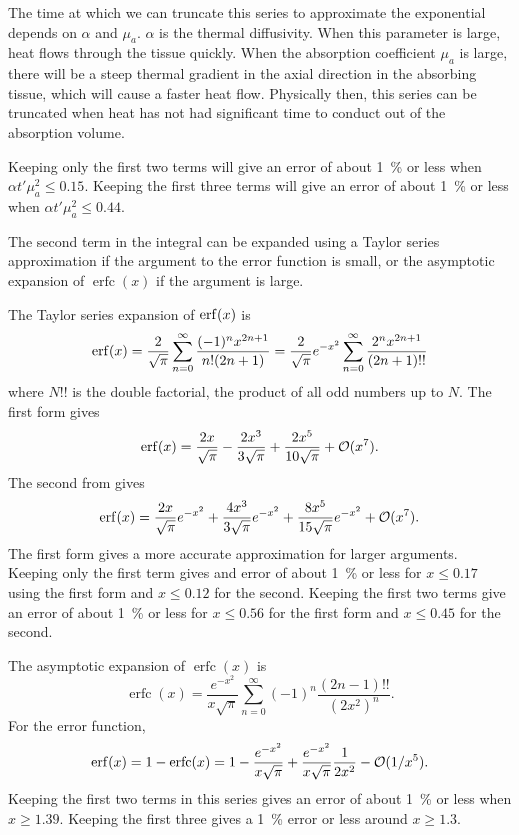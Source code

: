 \documentclass[]{article}
\DeclareMathOperator\erfc{erfc}
\begin{document}
The time at which we can truncate this series to approximate the exponential depends on $\alpha$ and $\mu_a$. $\alpha$ is the thermal diffusivity. When this parameter is large, heat
flows through the tissue quickly. When the absorption coefficient $\mu_a$ is large, there will be a steep thermal gradient in the axial direction in the absorbing tissue, which will cause
a faster heat flow. Physically then, this series can be truncated when heat has not had significant time to conduct out of the absorption volume.

Keeping only the first two terms will give an error of about \SI{1}{\percent} or less when $\alpha t' \mu_a^2 \le 0.15$. Keeping the first three terms will give an error of about \SI{1}{\percent} or less when
$\alpha t' \mu_a^2 \le 0.44$.

The second term in the integral can be expanded using a Taylor series approximation if the argument to the error function is small, or the asymptotic expansion of $\erfc(x)$ if the argument is large.

The Taylor series expansion of $\erf(x)$ is
\begin{equation}
	\erf(x) = \frac{2}{\sqrt{\pi}} \sum_{n=0}^\infty \frac{(-1)^n x^{2n+1}} { n! (2n+1)} = \frac{2}{\sqrt{\pi}} e^{-x^2} \sum_{n=0}^{\infty} \frac{2^n x^{2n+1}}{(2n+1)!!}
\end{equation}
where $N!!$ is the double factorial, the product of all odd numbers up to $N$. 
The first form gives
\begin{equation}
	\erf(x) = \frac{2x}{\sqrt{\pi}} - \frac{2x^3}{3\sqrt{\pi}}   + \frac{2x^5}{10\sqrt{\pi}}  + \mathcal{O}(x^7).
\end{equation}
The second from gives
\begin{equation}
	\erf(x) = \frac{2x}{\sqrt{\pi}} e^{-x^2} + \frac{4x^3}{3\sqrt{\pi}} e^{-x^2}  + \frac{8x^5}{15\sqrt{\pi}} e^{-x^2}+  \mathcal{O}(x^7).
\end{equation}
The first form gives a more accurate approximation for larger arguments. Keeping only the first term gives and error of about \SI{1}{\percent} or less for $x \le 0.17$ using the first form and $x \le 0.12$ for the second. Keeping the first two terms give an error of about \SI{1}{\percent} or less for $x \le 0.56$ for the first form and $x \le 0.45$ for the second.

	
The asymptotic expansion of $\erfc(x)$ is
\begin{equation}
	\erfc(x) = \frac{e^{-x^2}}{x\sqrt{\pi}} \sum_{n=0}^{\infty} (-1)^n \frac{(2n-1)!!}{(2x^2)^n}.
\end{equation}
For the error function,
\begin{equation}
	\erf(x) = 1 - \erfc(x) = 1 - \frac{e^{-x^2}}{x\sqrt{\pi}} +  \frac{e^{-x^2}}{x\sqrt{\pi}} \frac{1}{2 x^2} - \mathcal{O}( 1/x^5).
\end{equation}
Keeping the first two terms in this series gives an error of about \SI{1}{\percent} or less when $x \ge 1.39$. Keeping the first three gives a \SI{1}{\percent} error or less around $x \ge 1.3$.
\end{document}
